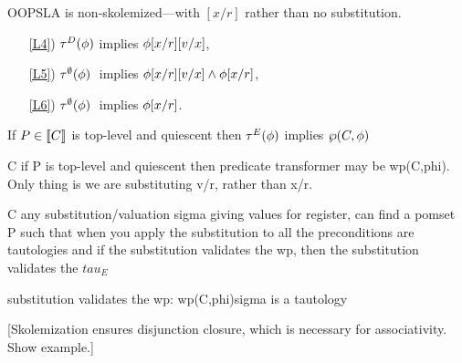 OOPSLA is non-skolemized---with $[x/r]$ rather than no substitution.
\begin{enumerate}
\item[\ref{L4})]
  $\aTr[\bEvs]\SB0(\aForm)$ implies $\aForm[\aLoc/\aReg][\aVal/\aLoc]$, 
\item[\ref{L5})]
  $\aTr[\emptyset]\SB0(\aForm)\;$ implies $\aForm[\aLoc/\aReg][\aVal/\aLoc]\land\aForm[\aLoc/\aReg]$,
\item[\ref{L6})]
  $\aTr[\emptyset]\SB0(\aForm)\;$ implies $\aForm[\aLoc/\aReg]$.
\end{enumerate}



\begin{proposition}
  If $\aPS\in\sem{\aCmd}$ is top-level and quiescent then 
  $\aTr[\aEvs](\aForm)$ implies $\wp(\aCmd,\aForm)$
\end{proposition}

C if P is top-level and quiescent then predicate transformer may be wp(C,phi).
Only thing is we are substituting v/r, rather than x/r.


C any substitution/valuation sigma giving values for register, can find a
pomset P such that when you apply the substitution to all the preconditions
are tautologies and if the substitution validates the wp, then the
substitution validates the $tau_E$

substitution validates the wp: wp(C,phi)sigma is a tautology




[Skolemization ensures disjunction closure, which is necessary
for associativity. Show example.]



